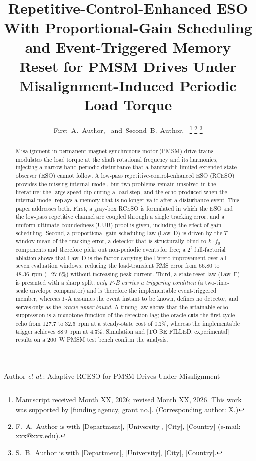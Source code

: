 \documentclass[journal]{IEEEtran}
\theoremstyle{remark}
\begin{document}
\title{Repetitive-Control-Enhanced ESO With Proportional-Gain Scheduling and
Event-Triggered Memory Reset for PMSM Drives Under Misalignment-Induced
Periodic Load Torque}

\author{First~A.~Author,~
        and~Second~B.~Author,~
\thanks{Manuscript received Month XX, 2026; revised Month XX, 2026.
This work was supported by [funding agency, grant no.]. (Corresponding author: X.)}
\thanks{F.~A.~Author is with [Department], [University], [City], [Country] (e-mail: xxx@xxx.edu).}
\thanks{S.~B.~Author is with [Department], [University], [City], [Country].}}

%
{Author \MakeLowercase{\textit{et al.}}: Adaptive RCESO for PMSM Drives Under Misalignment}

\maketitle

\begin{abstract}
Misalignment in permanent-magnet synchronous motor (PMSM) drive trains modulates
the load torque at the shaft rotational frequency and its harmonics, injecting a
narrow-band periodic disturbance that a bandwidth-limited extended state observer
(ESO) cannot follow. A low-pass repetitive-control-enhanced ESO (RCESO) provides
the missing internal model, but two problems remain unsolved in the literature:
the large speed dip during a load step, and the echo produced when the internal
model replays a memory that is no longer valid after a disturbance event. This paper
addresses both. First, a gray-box RCESO is formulated in which the ESO and the
low-pass repetitive channel are coupled through a single tracking error, and a
uniform ultimate boundedness (UUB) proof is given, including the effect of gain
scheduling. Second, a proportional-gain scheduling law (Law~D) is driven by the
$T$-window mean of the tracking error, a detector that is structurally blind to
$k\cdot f_0$ components and therefore picks out non-periodic events for free; a
$2^2$ full-factorial ablation shows that Law~D is the factor carrying the Pareto
improvement over all seven evaluation windows, reducing the load-transient RMS error
from 66.80 to 48.36~rpm ($-27.6\%$) without increasing peak current. Third, a state-reset
law (Law~F) is presented with a sharp split: \emph{only F-B carries a triggering
condition} (a two-time-scale envelope comparator) and is therefore the implementable
event-triggered member, whereas F-A assumes the event instant to be known, defines no
detector, and serves only as the \emph{oracle upper bound}. A timing law shows that the
attainable echo suppression is a monotone function of the detection lag; the oracle
cuts the first-cycle echo from 127.7 to 32.5~rpm at a steady-state cost of 0.2\%,
whereas the implementable trigger achieves 88.9~rpm at 4.3\%.
Simulation and [TO BE FILLED: experimental] results on a 200~W PMSM test bench
confirm the analysis.
\end{abstract}
\end{document}
